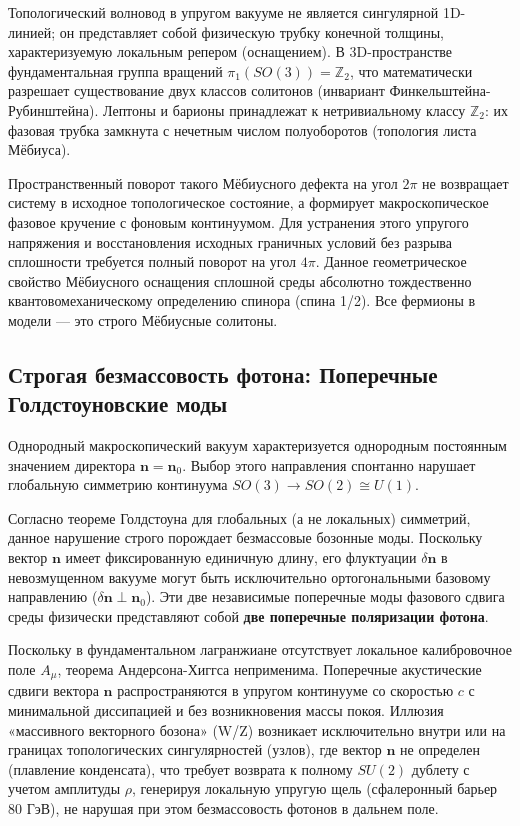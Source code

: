 \documentclass[11pt,a4paper]{article}
\begin{document}
	Топологический волновод в упругом вакууме не является сингулярной 1D-линией; он представляет собой физическую трубку конечной толщины, характеризуемую локальным репером (оснащением). В 3D-пространстве фундаментальная группа вращений $\pi_1(SO(3)) = \mathbb{Z}_2$, что математически разрешает существование двух классов солитонов (инвариант Финкельштейна-\\Рубинштейна).
	Лептоны и барионы принадлежат к нетривиальному классу $\mathbb{Z}_2$: их фазовая трубка замкнута с нечетным числом полуоборотов (топология листа Мёбиуса). 
	
	Пространственный поворот такого Мёбиусного дефекта на угол $2\pi$ не возвращает систему в исходное топологическое состояние, а формирует макроскопическое фазовое кручение с фоновым континуумом. Для устранения этого упругого напряжения и восстановления исходных граничных условий без разрыва сплошности требуется полный поворот на угол $4\pi$. Данное геометрическое свойство Мёбиусного оснащения сплошной среды абсолютно тождественно квантовомеханическому определению спинора (спина 1/2). Все фермионы в модели — это строго Мёбиусные солитоны.
	
	\subsection{Строгая безмассовость фотона: Поперечные Голдстоуновские моды}
	Однородный макроскопический вакуум характеризуется однородным постоянным значением директора $\mathbf{n} = \mathbf{n}_0$. Выбор этого направления спонтанно нарушает глобальную симметрию континуума $SO(3) \to SO(2) \cong U(1)$. 
	
	Согласно теореме Голдстоуна для глобальных (а не локальных) симметрий, данное нарушение строго порождает безмассовые бозонные моды. Поскольку вектор $\mathbf{n}$ имеет фиксированную единичную длину, его флуктуации $\delta \mathbf{n}$ в невозмущенном вакууме могут быть исключительно ортогональными базовому направлению ($\delta \mathbf{n} \perp \mathbf{n}_0$). 
	Эти две независимые поперечные моды фазового сдвига среды физически представляют собой \textbf{две поперечные поляризации фотона}. 
	
	Поскольку в фундаментальном лагранжиане отсутствует локальное калибровочное поле $A_\mu$, теорема Андерсона-Хиггса неприменима. Поперечные акустические сдвиги вектора $\mathbf{n}$ распространяются в упругом континууме со скоростью $c$ с минимальной диссипацией и без возникновения массы покоя. 
	Иллюзия «массивного векторного бозона» (W/Z) возникает исключительно внутри или на границах топологических сингулярностей (узлов), где вектор $\mathbf{n}$ не определен (плавление конденсата), что требует возврата к полному $SU(2)$ дублету с учетом амплитуды $\rho$, генерируя локальную упругую щель (сфалеронный барьер $80$ ГэВ), не нарушая при этом безмассовость фотонов в дальнем поле.
	
\end{document}
